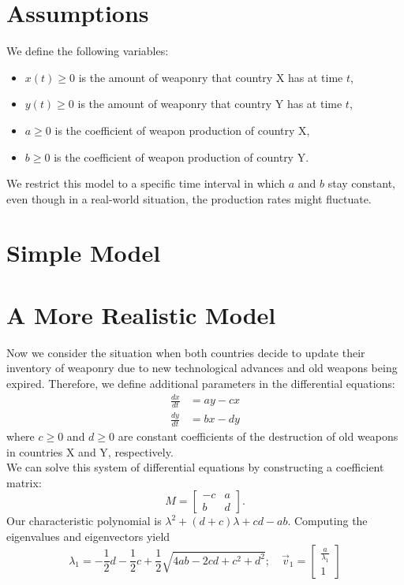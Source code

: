 \section{Assumptions}
We define the following variables:
\begin{itemize}
\item $x(t) \ge 0$ is the amount of weaponry that country X has at time $t$,
\item $y(t) \ge 0$ is the amount of weaponry that country Y has at time $t$,
\item $a \ge 0$ is the coefficient of weapon production of country X,
\item $b \ge 0$ is the coefficient of weapon production of country Y.
\end{itemize}
We restrict this model to a specific time interval in which $a$ and $b$ stay constant, even though in a real-world situation, the production rates might fluctuate.

\section{Simple Model}		

\section{A More Realistic Model}
Now we consider the situation when both countries decide to update their inventory of weaponry due to new technological advances and old weapons being expired. 
Therefore, we define additional parameters in the differential equations:
\begin{align}
\frac{dx}{dt} & = ay - cx \\
\frac{dy}{dt} & = bx - dy
\end{align}	
where $c \ge 0$ and $d \ge 0$ are constant coefficients of the destruction of old weapons in countries X and Y, respectively. \\
We can solve this system of differential equations by constructing a coefficient matrix:
\[
M=
  \begin{bmatrix}
    -c & a\\ 
    b & d
  \end{bmatrix}.
\]
Our characteristic polynomial is $\lambda^2 + (d+c)\lambda + cd - ab$. Computing the eigenvalues and eigenvectors yield
$$\lambda_1 = -\frac{1}{2}d - \frac{1}{2}c + \frac{1}{2}\sqrt{4ab -2cd + c^2 + d^2}; \quad \vec{v}_1 = 
\begin{bmatrix}
	\frac{a}{\lambda_1}\\
	1
\end{bmatrix} $$

